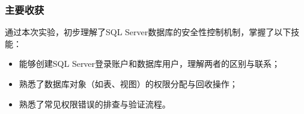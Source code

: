 \documentclass[a4paper]{article}
\begin{document}
\subsubsection{主要收获}
通过本次实验，初步理解了SQL Server数据库的安全性控制机制，掌握了以下技能：
\begin{itemize}
    \item 能够创建SQL Server登录账户和数据库用户，理解两者的区别与联系；
    \item 熟悉了数据库对象（如表、视图）的权限分配与回收操作；
    \item 熟悉了常见权限错误的排查与验证流程。
\end{itemize}
\end{document}
